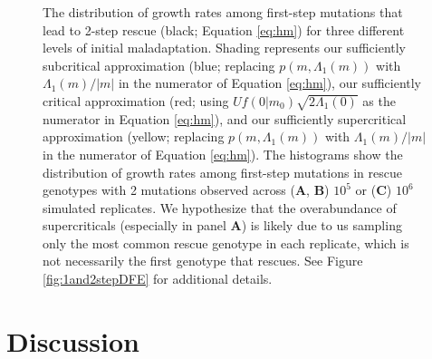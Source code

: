 \documentclass[9pt,twocolumn,twoside,lineno]{gsajnl}
\begin{document}
\begin{figure}[htbp]
\caption{
The distribution of growth rates among first-step mutations that lead to 2-step rescue (black; Equation \ref{eq:hm}) for three different levels of initial maladaptation.
Shading represents our sufficiently subcritical approximation (blue; replacing $p(m,\Lambda_1(m))$ with $\Lambda_1(m)/|m|$ in the numerator of Equation \ref{eq:hm}), our sufficiently critical approximation (red; using $U f(0|m_0) \sqrt{2 \Lambda_1(0)}$ as the numerator in Equation \ref{eq:hm}), and our sufficiently supercritical approximation (yellow; replacing $p(m,\Lambda_1(m))$ with $\Lambda_1(m)/|m|$ in the numerator of Equation \ref{eq:hm}).
The histograms show the distribution of growth rates among first-step mutations in rescue genotypes with 2 mutations observed across (\textbf{A}, \textbf{B}) $10^5$ or (\textbf{C}) $10^6$ simulated replicates.
We hypothesize that the overabundance of supercriticals (especially in panel \textbf{A}) is likely due to us sampling only the most common rescue genotype in each replicate, which is not necessarily the first genotype that rescues.
See Figure \ref{fig:1and2stepDFE} for additional details.
}%
\label{fig:2stepDFE}
\end{figure}

\section{Discussion}
\label{sec:discussion}
\end{document}
